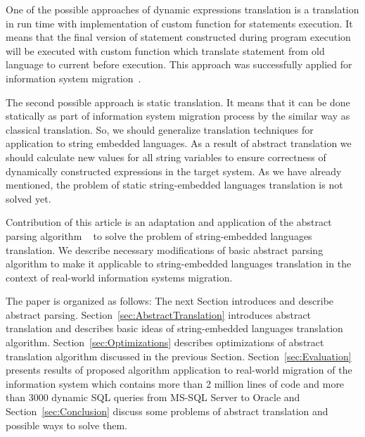 \documentclass{llncs}
\begin{document}
One of the possible approaches of dynamic expressions translation is a translation in run time with implementation of custom function for statements execution. It means that the final version of statement constructed during program execution will be executed with custom function which translate statement from old language to current before execution. This approach was successfully applied for information system migration~\cite{OpenSystemsDBMS}.

The second possible approach is static translation. It means that it can be done statically as part of information system migration process by the similar way as classical translation. So,  we should generalize translation techniques for application to string embedded languages.  As a result of abstract translation we should calculate new values for all string variables to ensure   correctness of dynamically constructed expressions in the target system. As we have already mentioned, the problem of static string-embedded languages translation is not solved yet.

Contribution of this article is an adaptation and application of the abstract parsing algorithm ~\cite{AbstrParsing} to solve the problem of string-embedded languages translation. We describe necessary modifications of basic abstract parsing algorithm to make it applicable to string-embedded languages translation in the context of real-world information systems migration. 

The paper is organized as follows: The next Section introduces and describe abstract parsing. Section~\ref{sec:AbstractTranslation} introduces abstract translation and describes basic ideas of string-embedded languages translation algorithm. Section~\ref{sec:Optimizations} describes optimizations of abstract translation algorithm discussed in the previous Section. Section~\ref{sec:Evaluation} presents results of proposed algorithm application to real-world migration of the information system which contains more than 2 million lines of code and more than 3000 dynamic SQL queries from MS-SQL Server to Oracle and Section~\ref{sec:Conclusion} discuss some problems of abstract translation and possible ways to solve them.
\end{document}
